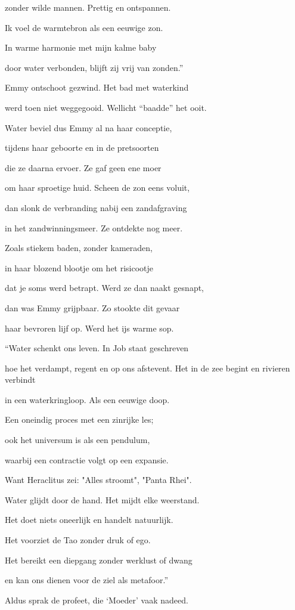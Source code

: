 zonder wilde mannen.
Prettig en ontspannen.

Ik voel de warmtebron
als een eeuwige zon.

In warme harmonie
met mijn kalme baby

door water verbonden,
blijft zij vrij van zonden.”

Emmy ontschoot gezwind.
Het bad met waterkind

werd toen niet weggegooid.
Wellicht “baadde” het ooit.

Water beviel dus Emmy
al na haar conceptie,

tijdens haar geboorte
en in de pretsoorten

die ze daarna ervoer.
Ze gaf geen ene moer

om haar sproetige huid.
Scheen de zon eens voluit,

dan slonk de verbranding
nabij een zandafgraving

in het zandwinningsmeer.
Ze ontdekte nog meer.

Zoals stiekem baden,
zonder kameraden,

in haar blozend blootje
om het risicootje

dat je soms werd betrapt.
Werd ze dan naakt gesnapt,

dan was Emmy grijpbaar.
Zo stookte dit gevaar

haar bevroren lijf op.
Werd het ijs warme sop.

“Water schenkt ons leven.
In Job staat geschreven

hoe het verdampt, regent
en op ons afstevent.
Het in de zee begint
en rivieren verbindt

in een waterkringloop.
Als een eeuwige doop.

Een oneindig proces
met een zinrijke les;

ook het universum
is als een pendulum,

waarbij een contractie
volgt op een expansie.

Want Heraclitus zei:
"Alles stroomt",  "Panta Rhei".

Water glijdt door de hand.
Het mijdt elke weerstand.

Het doet niets oneerlijk
en handelt natuurlijk.

Het voorziet de Tao
zonder druk of ego.

Het bereikt een diepgang
zonder werklust of dwang

en kan ons dienen voor
de ziel als metafoor.”

Aldus sprak de profeet,
die ‘Moeder’ vaak nadeed.

